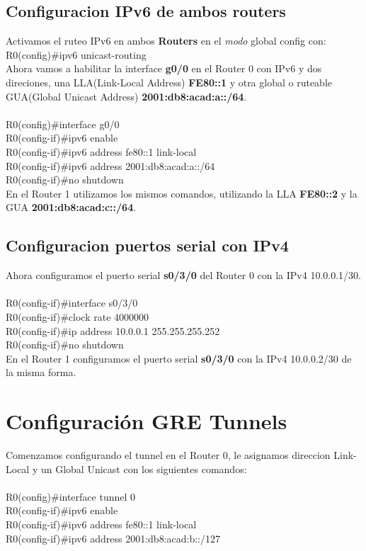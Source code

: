 \documentclass[a4paper,12pt]{article}
\begin{document}
\subsection{Configuracion IPv6 de ambos routers}
Activamos el ruteo IPv6 en ambos \textbf{Routers} en el \textit{modo} global config con:\\

R0(config)\#ipv6 unicast-routing\\

Ahora vamos a habilitar la interface \textbf{g0/0} en el Router 0 con IPv6 y dos direciones, una LLA(Link-Local Address) \textbf{FE80::1} y otra global o ruteable GUA(Global Unicast Address)\textbf{ 2001:db8:acad:a::/64}.\\
\noindent\\
R0(config)\#interface g0/0\\
R0(config-if)\#ipv6 enable\\
R0(config-if)\#ipv6 address fe80::1 link-local\\
R0(config-if)\#ipv6 address 2001:db8:acad:a::/64\\
R0(config-if)\#no shutdown\\

En el Router 1 utilizamos los mismos comandos, utilizando la LLA \textbf{FE80::2} y la GUA \textbf{2001:db8:acad:c::/64}.\\

\subsection{Configuracion puertos serial con IPv4}
Ahora configuramos el puerto serial \textbf{s0/3/0} del Router 0 con la IPv4 10.0.0.1/30.\\

\noindent\\
R0(config-if)\#interface s0/3/0\\
R0(config-if)\#clock rate 4000000\\
R0(config-if)\#ip address 10.0.0.1 255.255.255.252\\
R0(config-if)\#no shutdown\\

En el Router 1 configuramos el puerto serial \textbf{s0/3/0} con la IPv4 10.0.0.2/30 de la misma forma.\\

\section{Configuración GRE Tunnels}
Comenzamos configurando el tunnel en el Router 0, le asignamos direccion Link-Local y un Global Unicast con los siguientes comandos:\\
\noindent\\
R0(config)\#interface tunnel 0\\
R0(config-if)\#ipv6 enable\\
R0(config-if)\#ipv6 address fe80::1 link-local\\
R0(config-if)\#ipv6 address 2001:db8:acad:b::/127\\
\end{document}
